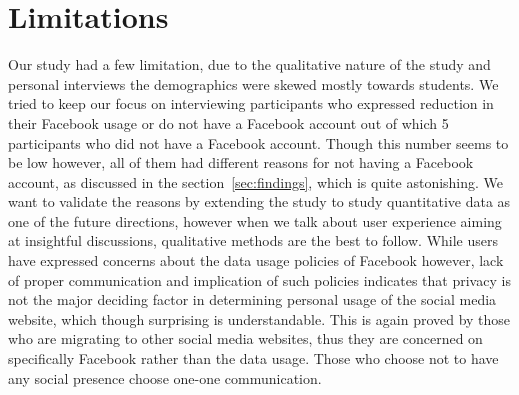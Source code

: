 \section{Limitations}
\label{sec:limitations}
Our study had a few limitation, due to the qualitative nature of the study and personal interviews the demographics were skewed mostly towards students. We tried to keep our focus on interviewing participants who expressed reduction in their Facebook usage or do not have a Facebook account out of which 5 participants who did not have a Facebook account. Though this number seems to be low however, all of them had different reasons for not having a Facebook account, as discussed in the section~\ref{sec:findings}, which is quite astonishing. We want to validate the reasons by extending the study to study quantitative data as one of the future directions, however when we talk about user experience aiming at insightful discussions, qualitative methods are the best to follow. While users have expressed concerns about the data usage policies of Facebook however, lack of proper communication and implication of such policies indicates that privacy is not the major deciding factor in determining personal usage of the social media website, which though surprising is understandable. This is again proved by those who are migrating to other social media websites, thus they are concerned on specifically Facebook rather than the data usage. Those who choose not to have any social presence choose one-one communication.
